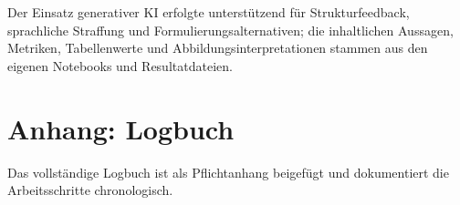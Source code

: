 \documentclass[9pt,a4paper,twocolumn,twoside]{tau-class/tau}
\begin{document}
Der Einsatz generativer KI erfolgte unterst\"utzend f\"ur Strukturfeedback, sprachliche Straffung und Formulierungsalternativen; die inhaltlichen Aussagen, Metriken, Tabellenwerte und Abbildungsinterpretationen stammen aus den eigenen Notebooks und Resultatdateien.
\printbibliography[heading=none]

\newpage

\section*{Anhang: Logbuch}
Das vollst\"andige Logbuch ist als Pflichtanhang beigef\"ugt und dokumentiert die Arbeitsschritte chronologisch.


\end{document}

